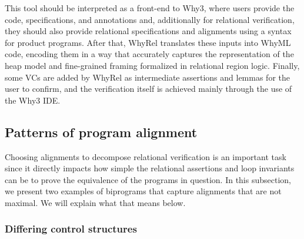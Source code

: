 This tool should be interpreted as a front-end to Why3, where users provide the code, specifications, and annotations and, additionally for relational verification, they should also provide relational specifications and alignments using a syntax for product programs.
After that, WhyRel translates these inputs into WhyML code, encoding them in a way that accurately captures the representation of the heap model and fine-grained framing formalized in relational region logic.
Finally, some VCs are added by WhyRel as intermediate assertions and lemmas for the user to confirm, and the verification itself is achieved mainly through the use of the Why3 IDE.


\subsection{Patterns of program alignment}
\label{subsec:whyrel_patterns}

Choosing alignments to decompose relational verification is an important task since it directly impacts how simple the relational assertions and loop invariants can be to prove the equivalence of the programs in question.
In this subsection, we present two examples of biprograms that capture alignments that are not maximal.
We will explain what that means below.


\subsubsection{Differing control structures}
\label{subsubsec:diff_control_structs}


